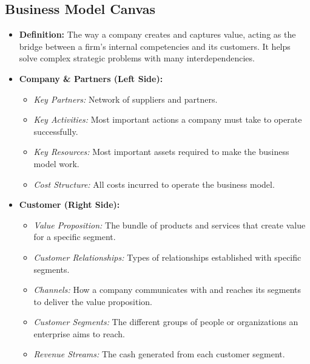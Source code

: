 \subsection*{Business Model Canvas}
\begin{itemize}
    \item \textbf{Definition:} The way a company creates and captures value, acting as the bridge
          between a firm's internal competencies and its customers. It helps solve
          complex strategic problems with many interdependencies.
    \item \textbf{Company \& Partners (Left Side):}
          \begin{itemize}
              \item \textit{Key Partners:} Network of suppliers and partners.
              \item \textit{Key Activities:} Most important actions a company must take to operate
                    successfully.
              \item \textit{Key Resources:} Most important assets required to make the business model work.
              \item \textit{Cost Structure:} All costs incurred to operate the business model.
          \end{itemize}
    \item \textbf{Customer (Right Side):}
          \begin{itemize}
              \item \textit{Value Proposition:} The bundle of products and services that create value for a
                    specific segment.
              \item \textit{Customer Relationships:} Types of relationships established with specific
                    segments.
              \item \textit{Channels:} How a company communicates with and reaches its segments to deliver
                    the value proposition.
              \item \textit{Customer Segments:} The different groups of people or organizations an
                    enterprise aims to reach.
              \item \textit{Revenue Streams:} The cash generated from each customer segment.
          \end{itemize}
\end{itemize}

